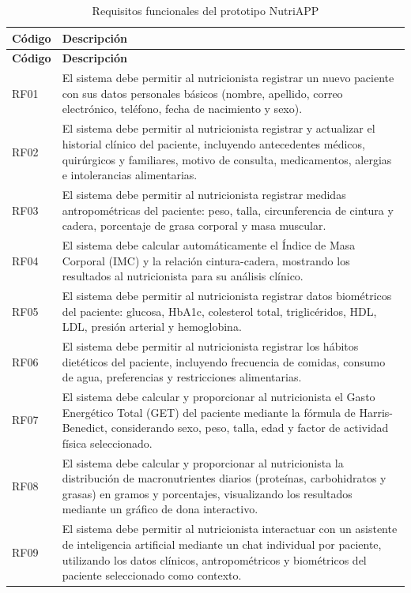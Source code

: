 {\small
\begin{longtable}{|p{1.3cm}|p{12.2cm}|}
\caption{Requisitos funcionales del prototipo NutriAPP}\label{tab:rf}\\
\hline
\textbf{Código} & \textbf{Descripción} \\ \hline
\endfirsthead
\hline
\textbf{Código} & \textbf{Descripción} \\ \hline
\endhead
RF01 & El sistema debe permitir al nutricionista registrar un nuevo paciente con sus datos personales básicos (nombre, apellido, correo electrónico, teléfono, fecha de nacimiento y sexo). \\ \hline
RF02 & El sistema debe permitir al nutricionista registrar y actualizar el historial clínico del paciente, incluyendo antecedentes médicos, quirúrgicos y familiares, motivo de consulta, medicamentos, alergias e intolerancias alimentarias. \\ \hline
RF03 & El sistema debe permitir al nutricionista registrar medidas antropométricas del paciente: peso, talla, circunferencia de cintura y cadera, porcentaje de grasa corporal y masa muscular. \\ \hline
RF04 & El sistema debe calcular automáticamente el Índice de Masa Corporal (IMC) y la relación cintura-cadera, mostrando los resultados al nutricionista para su análisis clínico. \\ \hline
RF05 & El sistema debe permitir al nutricionista registrar datos biométricos del paciente: glucosa, HbA1c, colesterol total, triglicéridos, HDL, LDL, presión arterial y hemoglobina. \\ \hline
RF06 & El sistema debe permitir al nutricionista registrar los hábitos dietéticos del paciente, incluyendo frecuencia de comidas, consumo de agua, preferencias y restricciones alimentarias. \\ \hline
RF07 & El sistema debe calcular y proporcionar al nutricionista el Gasto Energético Total (GET) del paciente mediante la fórmula de Harris-Benedict, considerando sexo, peso, talla, edad y factor de actividad física seleccionado. \\ \hline
RF08 & El sistema debe calcular y proporcionar al nutricionista la distribución de macronutrientes diarios (proteínas, carbohidratos y grasas) en gramos y porcentajes, visualizando los resultados mediante un gráfico de dona interactivo. \\ \hline
RF09 & El sistema debe permitir al nutricionista interactuar con un asistente de inteligencia artificial mediante un chat individual por paciente, utilizando los datos clínicos, antropométricos y biométricos del paciente seleccionado como contexto. \\ \hline

\end{longtable}}
